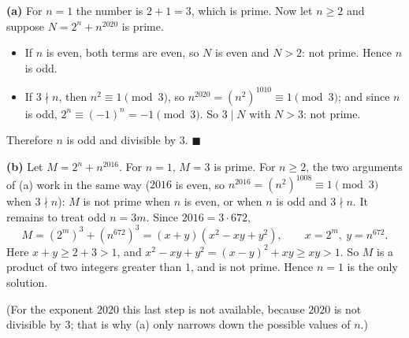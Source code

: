 \textbf{(a)} For $n=1$ the number is $2+1=3$, which is prime. Now let $n\ge2$ and suppose $N=2^n+n^{2020}$ is prime.
\begin{itemize}
\item If $n$ is even, both terms are even, so $N$ is even and $N>2$: not prime. Hence $n$ is odd.
\item If $3\nmid n$, then $n^2\equiv1\pmod 3$, so $n^{2020}=\left(n^2\right)^{1010}\equiv1\pmod3$; and since $n$ is odd, $2^n\equiv(-1)^n=-1\pmod 3$. So $3\mid N$ with $N>3$: not prime.
\end{itemize}
Therefore $n$ is odd and divisible by $3$. $\blacksquare$

\textbf{(b)} Let $M=2^n+n^{2016}$. For $n=1$, $M=3$ is prime. For $n\ge2$, the two arguments of (a) work in the same way ($2016$ is even, so $n^{2016}=\left(n^2\right)^{1008}\equiv1\pmod3$ when $3\nmid n$): $M$ is not prime when $n$ is even, or when $n$ is odd and $3\nmid n$. It remains to treat odd $n=3m$. Since $2016=3\cdot672$,
\[M=\left(2^m\right)^3+\left(n^{672}\right)^3=(x+y)\left(x^2-xy+y^2\right),\qquad x=2^m,\ y=n^{672}.\]
Here $x+y\ge2+3>1$, and $x^2-xy+y^2=(x-y)^2+xy\ge xy>1$. So $M$ is a product of two integers greater than $1$, and is not prime. Hence $\boxed{n=1}$ is the only solution.

(For the exponent $2020$ this last step is not available, because $2020$ is not divisible by $3$; that is why (a) only narrows down the possible values of $n$.)
